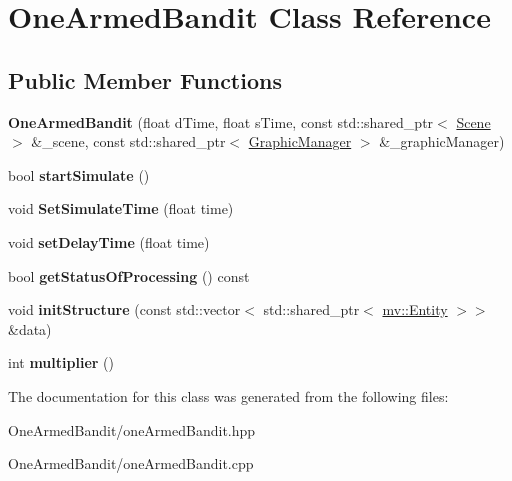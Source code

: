 \hypertarget{class_one_armed_bandit}{}\section{One\+Armed\+Bandit Class Reference}
\label{class_one_armed_bandit}
\subsection*{Public Member Functions}
\begin{DoxyCompactItemize}
\item 
\mbox{\label{class_one_armed_bandit_a45bf68bd8c76506ff68a0c523c59788d}} 
{\bfseries One\+Armed\+Bandit} (float d\+Time, float s\+Time, const std\+::shared\+\_\+ptr$<$ \mbox{\hyperlink{class_scene}{Scene}} $>$ \&\+\_\+scene, const std\+::shared\+\_\+ptr$<$ \mbox{\hyperlink{class_graphic_manager}{Graphic\+Manager}} $>$ \&\+\_\+graphic\+Manager)
\item 
\mbox{\label{class_one_armed_bandit_a8cf2610e14b939c87e84625931826bc5}} 
bool {\bfseries start\+Simulate} ()
\item 
\mbox{\label{class_one_armed_bandit_a85dc36a710ccabfffd5cc56d6255c350}} 
void {\bfseries Set\+Simulate\+Time} (float time)
\item 
\mbox{\label{class_one_armed_bandit_a227d7a5acdf875014950ab0cdcd058c6}} 
void {\bfseries set\+Delay\+Time} (float time)
\item 
\mbox{\label{class_one_armed_bandit_a240e0cb1ec7774c515e8c2fd980d164d}} 
bool {\bfseries get\+Status\+Of\+Processing} () const
\item 
\mbox{\label{class_one_armed_bandit_a9f025b7dceb1ae66c0713967a8d77e47}} 
void {\bfseries init\+Structure} (const std\+::vector$<$ std\+::shared\+\_\+ptr$<$ \mbox{\hyperlink{classmv_1_1_entity}{mv\+::\+Entity}} $>$$>$ \&data)
\item 
\mbox{\label{class_one_armed_bandit_a92128599ecc80f2b303c977fc688e3c6}} 
int {\bfseries multiplier} ()
\end{DoxyCompactItemize}


The documentation for this class was generated from the following files\+:\begin{DoxyCompactItemize}
\item 
One\+Armed\+Bandit/one\+Armed\+Bandit.\+hpp\item 
One\+Armed\+Bandit/one\+Armed\+Bandit.\+cpp\end{DoxyCompactItemize}
